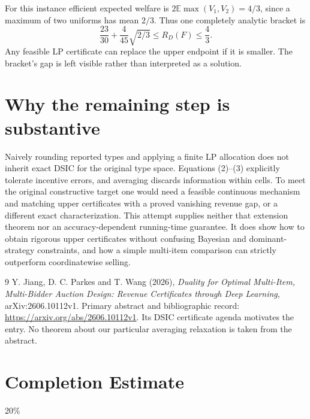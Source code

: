 \documentclass[11pt,a4paper]{article}
\theoremstyle{remark}
\newcommand{\E}{\mathbb E}
\begin{document}
For this instance efficient expected welfare is $2\E\max(V_1,V_2)=4/3$, since a maximum of two uniforms has mean $2/3$. Thus one completely analytic bracket is
\[
 \frac{23}{30}+\frac4{45}\sqrt{2/3}\le R_D(F)\le\frac43.
\]
Any feasible LP certificate can replace the upper endpoint if it is smaller. The bracket's gap is left visible rather than interpreted as a solution.

\section{Why the remaining step is substantive}
Naively rounding reported types and applying a finite LP allocation does not inherit exact DSIC for the original type space. Equations (2)--(3) explicitly tolerate incentive errors, and averaging discards information within cells. To meet the original constructive target one would need a feasible continuous mechanism and matching upper certificates with a proved vanishing revenue gap, or a different exact characterization. This attempt supplies neither that extension theorem nor an accuracy-dependent running-time guarantee. It does show how to obtain rigorous upper certificates without confusing Bayesian and dominant-strategy constraints, and how a simple multi-item comparison can strictly outperform coordinatewise selling.

\begin{thebibliography}{9}
 Y. Jiang, D. C. Parkes and T. Wang (2026), \emph{Duality for Optimal Multi-Item, Multi-Bidder Auction Design: Revenue Certificates through Deep Learning}, arXiv:2606.10112v1. Primary abstract and bibliographic record: \url{https://arxiv.org/abs/2606.10112v1}. Its DSIC certificate agenda motivates the entry. No theorem about our particular averaging relaxation is taken from the abstract.
\end{thebibliography}

\section{Completion Estimate}
20\%
\end{document}
